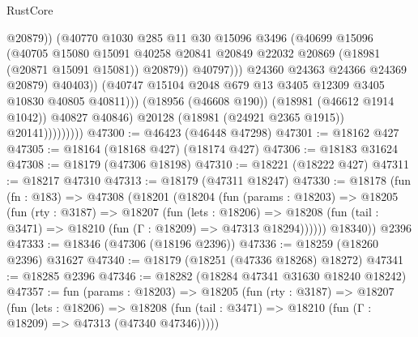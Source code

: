 \begin{lexlean}{RustCore}
\begin{coremodule}
                                          @20879))
                                      (@40770
                                        @1030
                                        @285
                                        @11
                                        @30
                                        @15096
                                        @3496
                                        (@40699
                                          @15096
                                          (@40705
                                            @15080
                                            @15091
                                            @40258
                                            @20841
                                            @20849
                                            @22032
                                            @20869
                                            (@18981 (@20871 @15091 @15081))
                                            @20879))
                                        @40797)))
                                  @24360
                                  @24363
                                  @24366
                                  @24369
                                  @20879)
                                @40403))
                            (@40747 @15104 @2048 @679 @13 @3405 @12309 @3405 @10830 @40805 @40811)))
                        (@18956 (@46608 @190))
                        (@18981 (@46612 @1914 @1042))
                        @40827
                        @40846)
                      @20128
                      (@18981 (@24921 @2365 @1915))
                      @20141)))))))))
@47300 := @46423 (@46448 @47298)
@47301 := @18162 @427
@47305 := @18164 (@18168 @427) (@18174 @427)
@47306 := @18183 @31624
@47308 := @18179 (@47306 @18198)
@47310 := @18221 (@18222 @427)
@47311 := @18217 @47310
@47313 := @18179 (@47311 @18247)
@47330 := @18178
    (fun (fn : @183) =>
    @47308
      (@18201
        (@18204
          (fun (params : @18203) =>
          @18205
            (fun (rty : @3187) =>
            @18207
              (fun (lets : @18206) =>
              @18208 (fun (tail : @3471) => @18210 (fun (Γ : @18209) => @47313 @18294))))))
        @18340))
    @2396
@47333 := @18346 (@47306 (@18196 @2396))
@47336 := @18259 (@18260 @2396) @31627
@47340 := @18179 (@18251 (@47336 @18268) @18272)
@47341 := @18285 @2396
@47346 := @18282 (@18284 @47341 @31630 @18240 @18242)
@47357 := fun (params : @18203) =>
  @18205
    (fun (rty : @3187) =>
    @18207
      (fun (lets : @18206) =>
      @18208 (fun (tail : @3471) => @18210 (fun (Γ : @18209) => @47313 (@47340 @47346)))))

\end{coremodule}
\end{lexlean}
